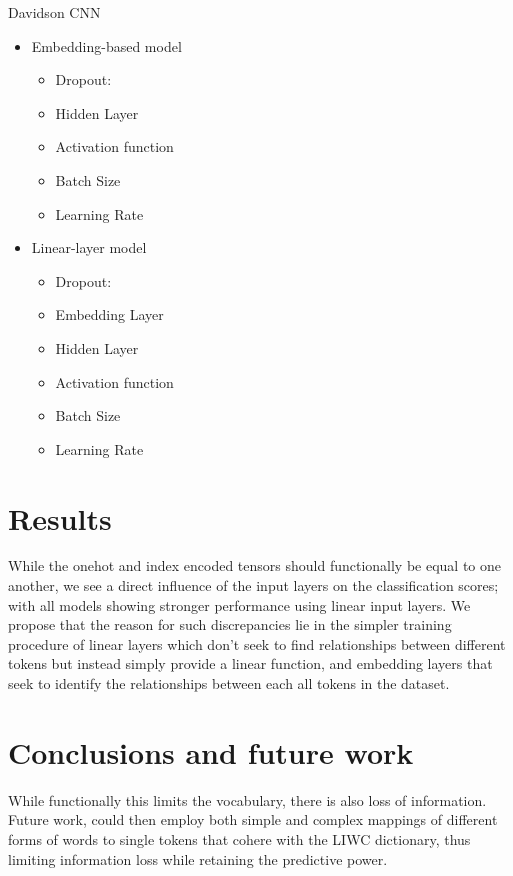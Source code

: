 Davidson CNN
\begin{itemize}
  \item Embedding-based model
    \begin{itemize}
      \item Dropout:
      \item Hidden Layer
      \item Activation function
      \item Batch Size
      \item Learning Rate
    \end{itemize}
  \item Linear-layer model
    \begin{itemize}
      \item Dropout:
      \item Embedding Layer
      \item Hidden Layer
      \item Activation function
      \item Batch Size
      \item Learning Rate
    \end{itemize}
\end{itemize}

\section{Results}

While the onehot and index encoded tensors should functionally be equal to one another, we see a direct influence of the input layers on the classification scores; with all models showing stronger performance using linear input layers. We propose that the reason for such discrepancies lie in the simpler training procedure of linear layers which don't seek to find relationships between different tokens but instead simply provide a linear function, and embedding layers that seek to identify the relationships between each all tokens in the dataset.

\section{Conclusions and future work}

While functionally this limits the vocabulary, there is also loss of information. Future work, could then employ both simple and complex mappings of different forms of words to single tokens that cohere with the LIWC dictionary, thus limiting information loss while retaining the predictive power.

\zw{}

